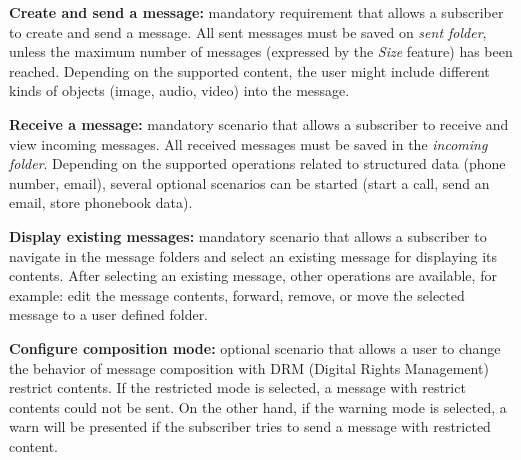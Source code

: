 \documentclass{acm_proc_article-sp}
\begin{document}
{\bf Create and send a message:} mandatory requirement that allows a subscriber to create and send a message. All sent messages must be saved on \emph{sent folder}, unless the maximum number of messages (expressed by the \emph{Size} feature) has been reached. Depending on the supported content, the user might include different kinds of objects (image, audio, video) into the message. 


{\bf Receive a message:} mandatory scenario that allows a subscriber to receive and view incoming messages. All received messages must be saved in the \emph{incoming folder}. Depending on the supported operations related to structured data (phone number, email), several optional scenarios can be started (start a call, send an email, store phonebook data).

{\bf Display existing messages:} mandatory scenario that allows a subscriber to navigate in the message folders and select an existing message for displaying its contents. After selecting an existing message, other operations are available, for example: edit the message contents, forward, remove, or move the selected message to a user defined folder. 



{\bf Configure composition mode:} optional scenario that allows a user to change the behavior of message composition with DRM (Digital Rights Management) restrict contents. If the restricted mode is selected, a message with restrict contents could not be sent. On the other hand, if the warning mode is selected, a warn will be presented if the subscriber tries to send a message with restricted content. %
\end{document}
